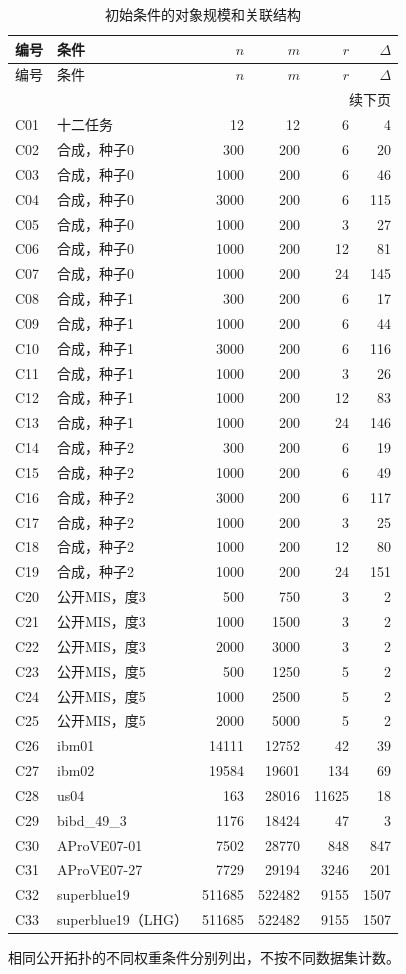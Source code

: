 {\small\setlength{\tabcolsep}{4pt}
\begin{longtable}{llrrrr}
\caption{初始条件的对象规模和关联结构}\label{tab:initial_parameters}\\
\toprule
编号 & 条件 & $n$ & $m$ & $r$ & $\Delta$\\
\midrule
\endfirsthead
\toprule
编号 & 条件 & $n$ & $m$ & $r$ & $\Delta$\\
\midrule
\endhead
\midrule
\multicolumn{6}{r}{续下页}\\
\endfoot
\bottomrule
\endlastfoot
C01 & 十二任务 & 12 & 12 & 6 & 4\\
C02 & 合成，种子0 & 300 & 200 & 6 & 20\\
C03 & 合成，种子0 & 1000 & 200 & 6 & 46\\
C04 & 合成，种子0 & 3000 & 200 & 6 & 115\\
C05 & 合成，种子0 & 1000 & 200 & 3 & 27\\
C06 & 合成，种子0 & 1000 & 200 & 12 & 81\\
C07 & 合成，种子0 & 1000 & 200 & 24 & 145\\
C08 & 合成，种子1 & 300 & 200 & 6 & 17\\
C09 & 合成，种子1 & 1000 & 200 & 6 & 44\\
C10 & 合成，种子1 & 3000 & 200 & 6 & 116\\
C11 & 合成，种子1 & 1000 & 200 & 3 & 26\\
C12 & 合成，种子1 & 1000 & 200 & 12 & 83\\
C13 & 合成，种子1 & 1000 & 200 & 24 & 146\\
C14 & 合成，种子2 & 300 & 200 & 6 & 19\\
C15 & 合成，种子2 & 1000 & 200 & 6 & 49\\
C16 & 合成，种子2 & 3000 & 200 & 6 & 117\\
C17 & 合成，种子2 & 1000 & 200 & 3 & 25\\
C18 & 合成，种子2 & 1000 & 200 & 12 & 80\\
C19 & 合成，种子2 & 1000 & 200 & 24 & 151\\
C20 & 公开MIS，度3 & 500 & 750 & 3 & 2\\
C21 & 公开MIS，度3 & 1000 & 1500 & 3 & 2\\
C22 & 公开MIS，度3 & 2000 & 3000 & 3 & 2\\
C23 & 公开MIS，度5 & 500 & 1250 & 5 & 2\\
C24 & 公开MIS，度5 & 1000 & 2500 & 5 & 2\\
C25 & 公开MIS，度5 & 2000 & 5000 & 5 & 2\\
C26 & ibm01 & 14111 & 12752 & 42 & 39\\
C27 & ibm02 & 19584 & 19601 & 134 & 69\\
C28 & us04 & 163 & 28016 & 11625 & 18\\
C29 & bibd\_49\_3 & 1176 & 18424 & 47 & 3\\
C30 & AProVE07-01 & 7502 & 28770 & 848 & 847\\
C31 & AProVE07-27 & 7729 & 29194 & 3246 & 201\\
C32 & superblue19 & 511685 & 522482 & 9155 & 1507\\
C33 & superblue19（LHG） & 511685 & 522482 & 9155 & 1507\\
\end{longtable}
}
相同公开拓扑的不同权重条件分别列出，不按不同数据集计数。
